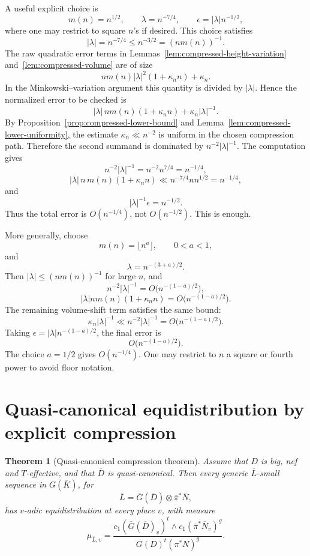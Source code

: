 \documentclass[10pt,a4paper]{amsart}
\theoremstyle{plain}
\newtheorem{theorem}{Theorem}
\theoremstyle{plain}
\numberwithin{equation}{section}
\providecommand{\ol}{\overline}
\begin{document}
A useful explicit choice is
\[
m(n)=n^{1/2},\qquad \lambda=n^{-7/4},
\qquad \epsilon=|\lambda|n^{-1/2},
\]
where one may restrict to square \(n\)'s if desired.  This choice satisfies
\[
|\lambda|=n^{-7/4}\le n^{-3/2}=(nm(n))^{-1}.
\]
The raw quadratic error terms in Lemmas~\ref{lem:compressed-height-variation}
and~\ref{lem:compressed-volume} are of size
\[
nm(n)|\lambda|^2(1+\kappa_n n)+\kappa_n .
\]
In the Minkowski--variation argument this quantity is divided by
\(|\lambda|\).  Hence the normalized error to be checked is
\[
|\lambda|\,nm(n)(1+\kappa_n n)+\kappa_n|\lambda|^{-1}.
\]
By Proposition~\ref{prop:compressed-lower-bound} and
Lemma~\ref{lem:compressed-lower-uniformity}, the estimate
\(\kappa_n\ll n^{-2}\) is uniform in the chosen compression path.  Therefore
the second summand is dominated by
\(n^{-2}|\lambda|^{-1}\).  The computation gives
\[
n^{-2}|\lambda|^{-1}
=n^{-2}n^{7/4}=n^{-1/4},
\]
\[
|\lambda|\,n\,m(n)(1+\kappa_n n)
\ll
n^{-7/4}n n^{1/2}
=n^{-1/4},
\]
and
\[
|\lambda|^{-1}\epsilon=n^{-1/2}.
\]
Thus the total error is \(O(n^{-1/4})\), not \(O(n^{-1/2})\).  This is enough.

More generally, choose
\[
m(n)=\lfloor n^a\rfloor,\qquad 0<a<1,
\]
and
\[
\lambda=n^{-(3+a)/2}.
\]
Then \(|\lambda|\le (nm(n))^{-1}\) for large \(n\), and
\[
n^{-2}|\lambda|^{-1}
=
O\bigl(n^{-(1-a)/2}\bigr),
\]
\[
|\lambda|nm(n)(1+\kappa_n n)
=
O\bigl(n^{-(1-a)/2}\bigr).
\]
The remaining volume-shift term satisfies the same bound:
\[
\kappa_n|\lambda|^{-1}
\ll
n^{-2}|\lambda|^{-1}
=
O\bigl(n^{-(1-a)/2}\bigr).
\]
Taking \(\epsilon=|\lambda|n^{-(1-a)/2}\), the final error is
\[
O\bigl(n^{-(1-a)/2}\bigr).
\]
The choice \(a=1/2\) gives \(O(n^{-1/4})\).  One may restrict to \(n\) a square
or fourth power to avoid floor notation.

\section{Quasi-canonical equidistribution by explicit compression}

\begin{theorem}[Quasi-canonical compression theorem]
	\label{thm:qcanonical-compression}
	Assume that \(D\) is big, nef and \(T\)-effective, and that \(\ol D\) is
	quasi-canonical.  Then every generic \(\ol L\)-small sequence in
	\(G(\overline K)\), for
	\[
	\ol L=\ol G(\ol D)\otimes\ol\pi^*\ol N,
	\]
	has \(v\)-adic equidistribution at every place \(v\), with measure
	\[
	\mu_{\ol L,v}
	=
	\frac{
		c_1(\ol G(\ol D)_v)^t\wedge c_1(\ol\pi^*\ol N_v)^g
	}{
		G(D)^t(\pi^*N)^g
	}.
	\]
\end{theorem}
\end{document}
